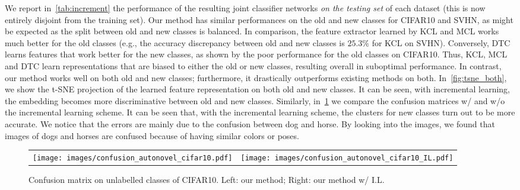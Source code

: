 We report in~\cref{tab:increment} the performance of the resulting joint classifier networks \emph{on the testing set} of each dataset (this is now entirely disjoint from the training set).
Our method has similar performances on the old and new classes for CIFAR10 and SVHN, as might be expected as the split between old and new classes is balanced.
In comparison, the feature extractor learned by KCL and MCL works much better for the old classes (e.g., the accuracy discrepancy between old and new classes is $25.3\%$ for KCL on SVHN).
Conversely, DTC learns features that work better for the new classes, as shown by the poor performance for the old classes on CIFAR10.
Thus, KCL, MCL and DTC learn representations that are biased to either the old or new classes, resulting overall in suboptimal performance.
In contrast, our method works well on both old and new classes; furthermore, it drastically outperforms existing methods on both.
In~\cref{fig:tsne_both}, we show the t-SNE projection of the learned feature representation on both old and new classes. It can be seen, with incremental learning, the embedding becomes more discriminative between old and new classes. Similarly, in~\cref{fig:conf_cifar5} we compare the confusion matrices w/ and w/o the incremental learning scheme. It can be seen that, with the incremental learning scheme, the clusters for new classes turn out to be more accurate. We notice that the errors are mainly due to the confusion between dog and horse. By looking into the images, we found that images of dogs and horses are confused because of having similar colors or poses.


\begin{figure}
\centering
\tabcolsep=0.02cm
\renewcommand{\arraystretch}{0.25}
\begin{tabular}[b]{cc}
    {\texttt{[image: images/confusion\_autonovel\_cifar10.pdf]}} &
    {\texttt{[image: images/confusion\_autonovel\_cifar10\_IL.pdf]}} \\
\end{tabular}\hfill \caption{Confusion matrix on unlabelled classes of CIFAR10. Left: our method; Right: our method w/ I.L.}
\label{fig:conf_cifar5}
\end{figure}


